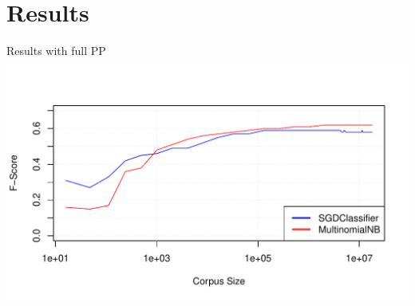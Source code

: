 \documentclass{beamer}
\begin{document}
\section{Results}
\begin{frame}{Results with full PP}
    \includegraphics[scale=0.65]{fullpp.pdf}
\end{frame}
\end{document}
